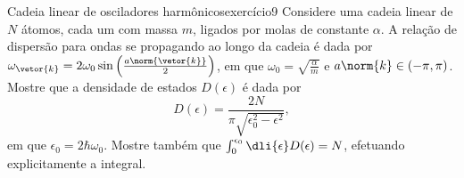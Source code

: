 \begin{exercício}{Cadeia linear de osciladores harmônicos}{exercício9}
    Considere uma cadeia linear de \(N\) átomos, cada um com massa \(m\), ligados por molas de constante \(\alpha\). A relação de dispersão para ondas se propagando ao longo da cadeia é dada por \(\omega_{\vetor{k}} = 2 \omega_0 \sin\left(\frac{a \norm{\vetor{k}}}{2}\right)\), em que \(\omega_0 = \sqrt{\frac{\alpha}{m}}\) e \(a \norm{k} \in (-\pi,\pi)\). Mostre que a densidade de estados \(D(\epsilon)\) é dada por
    \begin{equation*}
        D(\epsilon) = \frac{2N}{\pi\sqrt{\epsilon_0^2 - \epsilon^2}},
    \end{equation*}
    em que \(\epsilon_0 = 2\hbar \omega_0\). Mostre também que \(\int_0^{\epsilon_0} \dli{\epsilon} D(\epsilon) = N\), efetuando explicitamente a integral.
\end{exercício}
